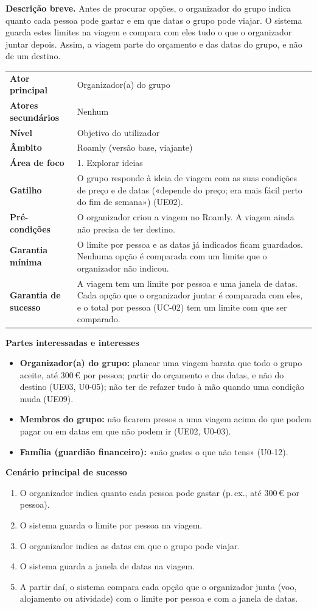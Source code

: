 \documentclass[11pt,a4paper]{article}
\newcommand{\reg}[1]{{\footnotesize\textcolor{pendente}{(#1)}}}
\newenvironment{usecase}[2]{%
  \par\medskip\noindent{\large\bfseries\color{roamly}#1: #2}\par\smallskip\small\noindent\ignorespaces}{\par\medskip}
\newcommand{\ucField}[2]{\textbf{#1} & #2 \\}
\begin{document}
\begin{usecase}{UC-01}{Definir os limites da viagem}
\textbf{Descrição breve.} Antes de procurar opções, o organizador do grupo indica quanto cada pessoa pode gastar e em que datas o grupo pode viajar. O sistema guarda estes limites na viagem e compara com eles tudo o que o organizador juntar depois. Assim, a viagem parte do orçamento e das datas do grupo, e não de um destino.\par\smallskip
\begin{tabularx}{\textwidth}{@{}>{\raggedright\arraybackslash}p{3.4cm}L@{}}
\toprule
\ucField{Ator principal}{Organizador(a) do grupo}
\ucField{Atores secundários}{Nenhum}
\ucField{Nível}{Objetivo do utilizador}
\ucField{Âmbito}{Roamly (versão base, viajante)}
\ucField{Área de foco}{1. Explorar ideias}
\ucField{Gatilho}{O grupo responde à ideia de viagem com as suas condições de preço e de datas («depende do preço; era mais fácil perto do fim de semana») \reg{UE02}.}
\ucField{Pré-condições}{O organizador criou a viagem no Roamly. A viagem ainda não precisa de ter destino.}
\ucField{Garantia mínima}{O limite por pessoa e as datas já indicados ficam guardados. Nenhuma opção é comparada com um limite que o organizador não indicou.}
\ucField{Garantia de sucesso}{A viagem tem um limite por pessoa e uma janela de datas. Cada opção que o organizador juntar é comparada com eles, e o total por pessoa (UC-02) tem um limite com que ser comparado.}
\bottomrule
\end{tabularx}

\medskip
\textbf{Partes interessadas e interesses}
\begin{itemize}
  \item \textbf{Organizador(a) do grupo:} planear uma viagem barata que todo o grupo aceite, até 300\,€ por pessoa; partir do orçamento e das datas, e não do destino \reg{UE03, U0-05}; não ter de refazer tudo à mão quando uma condição muda \reg{UE09}.
  \item \textbf{Membros do grupo:} não ficarem presos a uma viagem acima do que podem pagar ou em datas em que não podem ir \reg{UE02, U0-03}.
  \item \textbf{Família (guardião financeiro):} «não gastes o que não tens» \reg{U0-12}.
\end{itemize}

\textbf{Cenário principal de sucesso}
\begin{enumerate}
  \item O organizador indica quanto cada pessoa pode gastar (p.\,ex., até 300\,€ por pessoa).
  \item O sistema guarda o limite por pessoa na viagem.
  \item O organizador indica as datas em que o grupo pode viajar.
  \item O sistema guarda a janela de datas na viagem.
  \item A partir daí, o sistema compara cada opção que o organizador junta (voo, alojamento ou atividade) com o limite por pessoa e com a janela de datas.
\end{enumerate}


\end{usecase}
\end{document}
